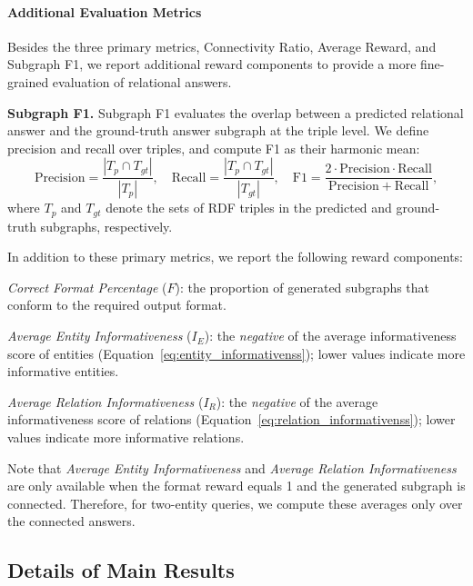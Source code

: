 \paragraph{Additional Evaluation Metrics}
Besides the three primary metrics, Connectivity Ratio, Average Reward, and Subgraph F1, 
we report additional reward components to provide a more fine-grained evaluation of relational answers.

\noindent
\textbf{Subgraph F1.}
Subgraph F1 evaluates the overlap between a predicted relational answer and the ground-truth answer subgraph at the triple level.
We define precision and recall over triples, and compute F1 as their harmonic mean:
\begin{equation}
\label{eq:subgraph_f1}
\mathrm{Precision} = \frac{|T_p \cap T_{gt}|}{|T_p|}, \quad
\mathrm{Recall} = \frac{|T_p \cap T_{gt}|}{|T_{gt}|}, \quad
\mathrm{F1} = \frac{2 \cdot \mathrm{Precision} \cdot \mathrm{Recall}}{\mathrm{Precision} + \mathrm{Recall}},
\end{equation}
where $T_p$ and $T_{gt}$ denote the sets of RDF triples in the predicted and ground-truth subgraphs, respectively.

\noindent
In addition to these primary metrics, we report the following reward components:

\squishlist
  \item \textit{Correct Format Percentage} ($F$): the proportion of generated subgraphs that conform to the required output format.
  \item \textit{Average Entity Informativeness} ($I_E$): the \textit{negative} of the average informativeness score of entities (Equation~\ref{eq:entity_informativenss}); lower values indicate more informative entities.
  \item \textit{Average Relation Informativeness} ($I_R$): the \textit{negative} of the average informativeness score of relations (Equation~\ref{eq:relation_informativenss}); lower values indicate more informative relations.
\squishend

\noindent
Note that \textit{Average Entity Informativeness} and \textit{Average Relation Informativeness} are only available when the format reward equals 1 and the generated subgraph is connected.
Therefore, for two-entity queries, we compute these averages only over the connected answers.





\subsection{Details of Main Results}\label{sec:main_results_details}

